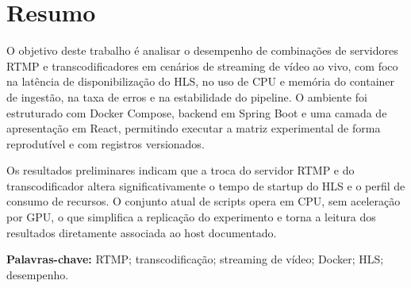 \section*{Resumo}

O objetivo deste trabalho é analisar o desempenho de combinações de servidores RTMP e transcodificadores em cenários de streaming de vídeo ao vivo, com foco na latência de disponibilização do HLS, no uso de CPU e memória do container de ingestão, na taxa de erros e na estabilidade do pipeline. O ambiente foi estruturado com Docker Compose, backend em Spring Boot e uma camada de apresentação em React, permitindo executar a matriz experimental de forma reprodutível e com registros versionados.

Os resultados preliminares indicam que a troca do servidor RTMP e do transcodificador altera significativamente o tempo de startup do HLS e o perfil de consumo de recursos. O conjunto atual de scripts opera em CPU, sem aceleração por GPU, o que simplifica a replicação do experimento e torna a leitura dos resultados diretamente associada ao host documentado.

\textbf{Palavras-chave:} RTMP; transcodificação; streaming de vídeo; Docker; HLS; desempenho.